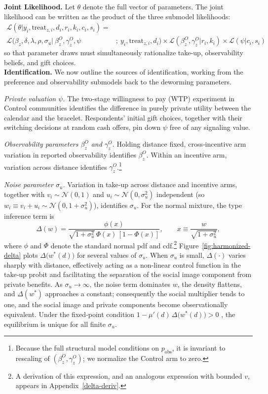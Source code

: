 \documentclass[12pt,a4paper]{article}
\begin{document}
\textbf{Joint Likelihood.} Let $\theta$ denote the full vector of parameters. The joint likelihood can be written as the product of the three submodel likelihoods:
\begin{align} \label{eq:joint-lh}
    \mathcal{L}(\theta | y_i, \textrm{treat}_{z,i}, d_i, r_i, k_i, c_i, s_i) = \nonumber 
    \\
    \mathcal{L}(\beta_z, \delta, \lambda, \rho, \sigma_u |\  \beta_z^O, \gamma_z^O, \psi&;\  
    y_i, \textrm{treat}_{z,i}, d_i) \times 
    \mathcal{L}(\beta^O_z, \gamma^O_z | r_i, k_i) \times \mathcal{L}(\psi | c_i, s_i)
\end{align}
so that parameter draws must simultaneously rationalize take‑up, observability beliefs, and gift choices.\\

\textbf{Identification.}  
We now outline the sources of identification, working from the preference and observability submodels back to the deworming parameters.

\emph{Private valuation \(\psi\).}  The two‑stage willingness to pay (WTP) experiment in Control communities identifies the difference in purely private utility between the calendar and the bracelet.  Respondents’ initial gift choices, together with their switching decisions at random cash offers, pin down \(\psi\) free of any signaling value.


\emph{Observability parameters \(\beta^{O}_{z}\) and \(\gamma^{O}_{z}\).}  
Holding distance fixed, cross‑incentive arm variation in reported observability identifies \(\beta^{O}_{z}\).  Within an incentive arm, variation across distance identifies \(\gamma^{O}_{z}\).\footnote{Because the full structural model conditions on \(p_{\text{obs}}\), it is invariant to rescaling of \((\beta^{O}_{z},\gamma^{O}_{z})\); we normalize the Control arm to zero.}

\emph{Noise parameter \(\sigma_u\).} 
Variation in take‑up across distance and incentive arms, together with
\(v_i\sim\mathcal N(0,1)\) and \(u_i\sim\mathcal N(0,\sigma_u^{2})\) independent (so \(w_i\equiv v_i+u_i\sim\mathcal N(0,1+\sigma_u^{2})\)),
identifies \(\sigma_u\).
For the normal mixture, the type inference term is
\[
\Delta(w)
=
\frac{\phi(x)}
     {\sqrt{1+\sigma_u^{2}}\,
      \Phi(x)\,[1-\Phi(x)]},
\qquad
x\equiv \frac{w}{\sqrt{1+\sigma_u^{2}}},
\]
where \(\phi\) and \(\Phi\) denote the standard normal pdf and cdf.\footnote{A derivation of this expression, and an analogous expression with bounded \(v\), appears in Appendix~\ref{delta-deriv}.}
Figure~\ref{fig:harmonized-delta} plots \(\Delta\!\bigl(w^{\ast}(d)\bigr)\) for several values of \(\sigma_u\).
When \(\sigma_u\) is small, \(\Delta(\cdot)\) varies sharply with distance, effectively acting as a non-linear control function in the take‑up probit and facilitating the separation of the social image component from private benefits.
As \(\sigma_u\to\infty\), the noise term dominates \(w\), the density flattens, and \(\Delta(w^{\ast})\) approaches a constant; consequently the social multiplier tends to one, and the social image and private components become observationally equivalent. Under the fixed‑point condition
\(1-\mu'(d)\,\Delta\!\bigl(w^{\ast}(d)\bigr)>0\) \citep{Benabou_laws_2011},
the equilibrium is unique for all finite \(\sigma_u\).
\end{document}
